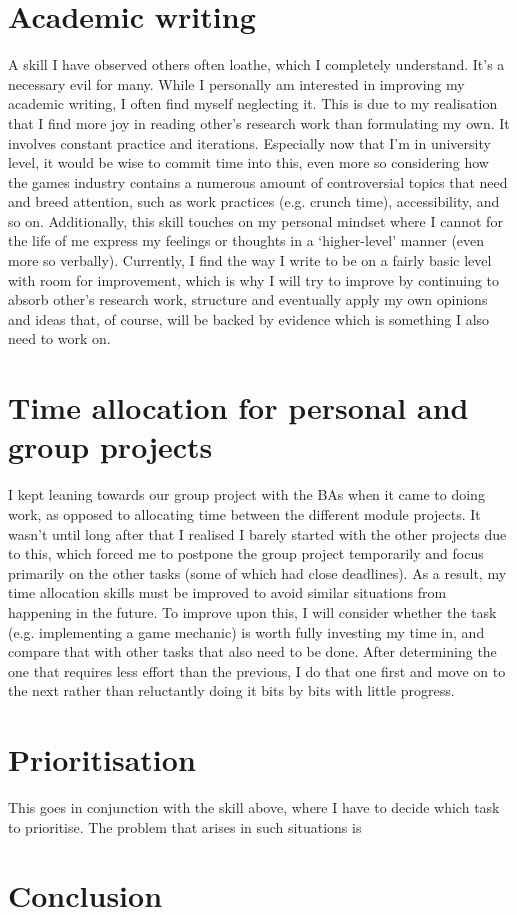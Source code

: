 \documentclass{scrartcl}
\begin{document}
\section{Academic writing}
A skill I have observed others often loathe, which I completely understand. It's a necessary evil for many. While I personally am interested in improving my academic writing, I often find myself neglecting it. This is due to my realisation that I find more joy in reading other's research work than formulating my own. It involves constant practice and iterations. Especially now that I'm in university level, it would be wise to commit time into this, even more so considering how the games industry contains a numerous amount of controversial topics that need and breed attention, such as work practices (e.g. crunch time), accessibility, and so on. Additionally, this skill touches on my personal mindset where I cannot for the life of me express my feelings or thoughts in a `higher-level' manner (even more so verbally). Currently, I find the way I write to be on a fairly basic level with room for improvement, which is why I will try to improve by continuing to absorb other's research work, structure and eventually apply my own opinions and ideas that, of course, will be backed by evidence which is something I also need to work on. 

\section{Time allocation for personal and group projects}
I kept leaning towards our group project with the BAs when it came to doing work, as opposed to allocating time between the different module projects. It wasn't until long after that I realised I barely started with the other projects due to this, which forced me to postpone the group project temporarily and focus primarily on the other tasks (some of which had close deadlines). As a result, my time allocation skills must be improved to avoid similar situations from happening in the future. To improve upon this, I will consider whether the task (e.g. implementing a game mechanic) is worth fully investing my time in, and compare that with other tasks that also need to be done. After determining the one that requires less effort than the previous, I do that one first and move on to the next rather than reluctantly doing it bits by bits with little progress.  

\section{Prioritisation}
This goes in conjunction with the skill above, where I have to decide which task to prioritise. The problem that arises in such situations is 

\section{Conclusion}
\end{document}
